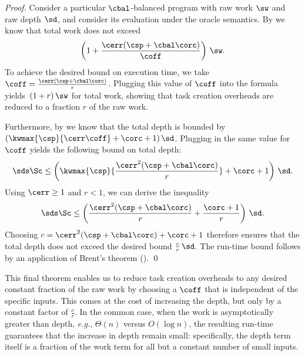 \begin{proof}
Consider a particular $\cbal$-balanced program 
with raw work $\sw$ and raw depth $\sd$,
and consider its evaluation under the oracle semantics.  
%
By  we know that total work does not exceed
\[
\left(1+\frac{\cerr(\csp+\cbal\corc)}{\coff} \right)\,{\sw}.
\]
To achieve the desired bound on execution time, we take 
 $\coff = \frac{\cerr(\csp + \cbal\corc)}{r}$.
Plugging this value of $\coff$ into the formula
yields~$(1+r)\,{\sw}$ for total work, showing
that task creation overheads are reduced to a fraction $r$ of
the raw work.

Furthermore, by  we know that the total depth 
is bounded by $(\kwmax{\csp}{\cerr\coff}+\corc+1)\,\sd$. Plugging in 
the same value for $\coff$ yields the following bound on total depth:
\[
\sds \Sc\leq \left(\kwmax{\csp}{\frac{\cerr^2(\csp +
    \cbal\corc)}{r}}+\corc + 1\right)\,\sd.
\]
Using $\cerr \ge 1$ and $r < 1$,
we can derive the inequality
\[
\sds \Sc\leq \left(\frac{\cerr^2(\csp + \cbal\corc)}{r}+\frac{\corc+1}{r}\right)\,\sd.
\]
Choosing $c = \cerr^2(\csp + \cbal\corc)+\corc+1$ 
therefore ensures that the total depth does not exceed the desired bound
$\frac{c}{r}\,\sd$.
The run-time bound follows by an application of 
Brent's theorem (). \qed
\end{proof}

This final theorem enables us to reduce task creation overheads to any
desired constant fraction of the raw work by choosing a $\coff$ that
is independent of the specific inputs.  This comes at the cost
of increasing the depth, but only by a constant factor of
$\frac{c}{r}$.  In the common case, when the work is
asymptotically greater than depth, \textit{e.g.}, $\Theta(n)$ versus
$O(\log{n})$, the resulting run-time guarantees that the increase in
depth remain small: specifically, the depth term itself is a fraction
of the work term for all but a constant number of small inputs.  





